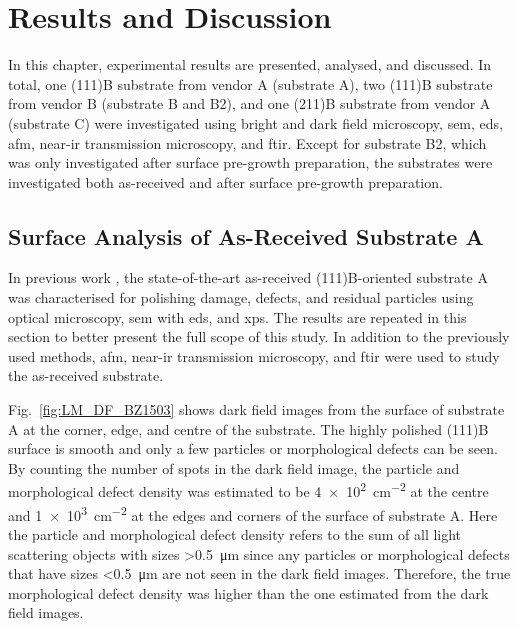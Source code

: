 \chapter{Results and Discussion}\label{ch:results-and-discussion}
In this chapter, experimental results are presented, analysed, and discussed. In total, one (111)B substrate from vendor A (substrate A), two (111)B substrate from vendor B (substrate B and B2), and one (211)B substrate from vendor A (substrate C) were investigated using bright and dark field microscopy, \ac{sem}, \ac{eds}, \ac{afm}, near-\ac{ir} transmission microscopy, and \ac{ftir}. Except for substrate B2, which was only investigated after surface pre-growth preparation, the substrates were investigated both as-received and after surface pre-growth preparation.%

\section{Surface Analysis of As-Received Substrate A}\label{sec:subAa}
In previous work \citep{lauten2017characterisation}, the state-of-the-art as-received (111)B-oriented substrate A was characterised for polishing damage, defects, and residual particles using optical microscopy, \ac{sem} with \ac{eds}, and \ac{xps}. The results are repeated in this section to better present the full scope of this study. In addition to the previously used methods, \ac{afm}, near-\ac{ir} transmission microscopy, and \ac{ftir} were used to study the as-received substrate.

Fig.~\ref{fig:LM_DF_BZ1503} shows dark field images from the surface of substrate A at the corner, edge, and centre of the substrate. The highly polished (111)B surface is smooth and only a few particles or morphological defects can be seen. By counting the number of spots in the dark field image, the particle and morphological defect density was estimated to be \SI{4e2}{\centi\metre^{-2}} at the centre and \SI{1e3}{\centi\metre^{-2}} at the edges and corners of the surface of substrate A. Here the particle and morphological defect density refers to the sum of all light scattering objects with sizes \SI{>0.5}{\micro\metre} since any particles or morphological defects that have sizes \SI{<0.5}{\micro\metre} are not seen in the dark field images. Therefore, the true morphological defect density was higher than the one estimated from the dark field images.

